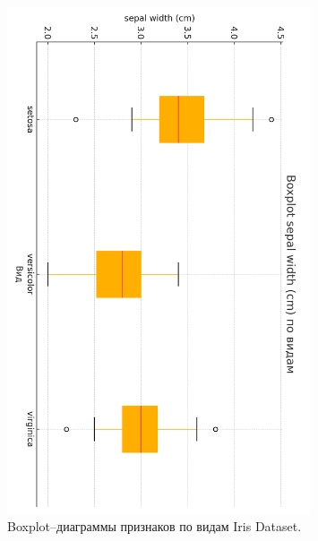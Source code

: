 \begin{figure}[H]
  \includegraphics[width=0.8\textwidth]{images/box_sepal_width_cm_cb2.png}
  \caption{Boxplot–диаграммы признаков по видам Iris Dataset.}
  \label{fig:iris_boxplots_vertical}
\end{figure}

